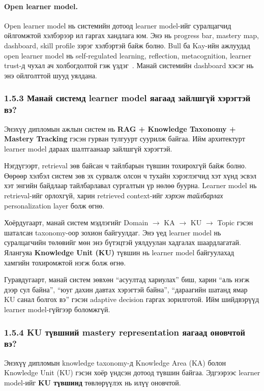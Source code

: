 \documentclass[12pt,A4]{report}
\begin{document}
\paragraph{Open learner model.}
Open learner model нь системийн дотоод learner model-ийг суралцагчид ойлгомжтой хэлбэрээр ил гаргах хандлага юм. Энэ нь progress bar, mastery map, dashboard, skill profile зэрэг хэлбэртэй байж болно. Bull ба Kay-ийн ажлуудад open learner model нь self-regulated learning, reflection, metacognition, learner trust-д чухал ач холбогдолтой гэж үздэг~\cite{bull2010,kay1997}. Манай системийн dashboard хэсэг нь энэ ойлголттой шууд уялдана.

\subsubsection{1.5.3 Манай системд learner model яагаад зайлшгүй хэрэгтэй вэ?}

Энэхүү дипломын ажлын систем нь \textbf{RAG + Knowledge Taxonomy + Mastery Tracking} гэсэн гурван тулгуурт суурилж байгаа. Ийм архитектурт learner model дараах шалтгаанаар зайлшгүй хэрэгтэй.

Нэгдүгээрт, retrieval зөв байсан ч тайлбарын түвшин тохирохгүй байж болно. Өөрөөр хэлбэл систем зөв эх сурвалж олсон ч тухайн хэрэглэгчид хэт хүнд эсвэл хэт энгийн байдлаар тайлбарлавал сургалтын үр нөлөө буурна. Learner model нь retrieval-ийг орлохгүй, харин retrieved context-ийг \emph{хэрхэн тайлбарлах} personalization layer болж өгнө.

Хоёрдугаарт, манай систем мэдлэгийг Domain $\rightarrow$ KA $\rightarrow$ KU $\rightarrow$ Topic гэсэн шаталсан taxonomy-оор зохион байгуулдаг. Энэ үед learner model нь суралцагчийн төлөвийг мөн энэ бүтэцтэй уялдуулан хадгалах шаардлагатай. Ялангуяа \textbf{Knowledge Unit (KU)} түвшин нь learner model байгуулахад хамгийн тохиромжтой нэгж болж өгнө.

Гуравдугаарт, манай систем зөвхөн ``асуултад хариулах'' биш, харин ``аль нэгж дээр сул байна'', ``юуг дахин давтах хэрэгтэй байна'', ``дараагийн шатанд ямар KU санал болгох вэ'' гэсэн adaptive decision гаргах зорилготой. Ийм шийдвэрүүд learner model-гүйгээр боломжгүй.

\subsubsection{1.5.4 KU түвшний mastery representation яагаад оновчтой вэ?}

Энэхүү дипломын knowledge taxonomy-д Knowledge Area (KA) болон Knowledge Unit (KU) гэсэн хоёр үндсэн дотоод түвшин байгаа. Эдгээрээс learner model-ийг \textbf{KU түвшинд} төвлөрүүлэх нь илүү оновчтой.
\end{document}
